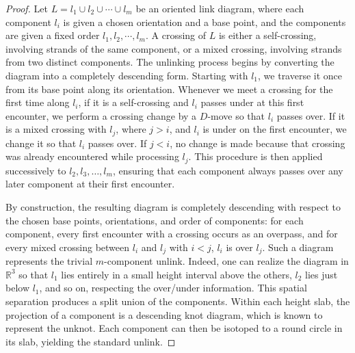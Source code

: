 \documentclass[10pt,a4paper]{amsart}
\begin{document}
\begin{proof}
Let $L = l_1 \cup l_2 \cup \cdots \cup l_m$ be an oriented link diagram, where each component $l_i$ is given a chosen orientation and a base point, and the components are given a fixed order $l_1, l_2, \cdots, l_m$. A crossing of $L$ is either a self-crossing, involving strands of the same component, or a mixed crossing, involving strands from two distinct components. The unlinking process begins by converting the diagram into a completely descending form. Starting with $l_1$, we traverse it once from its base point along its orientation. Whenever we meet a crossing for the first time along $l_i$, if it is a self-crossing and $l_i$ passes under at this first encounter, we perform a crossing change by a $D$-move so that $l_i$ passes over. If it is a mixed crossing with $l_j$, where $j>i$, and $l_i$ is under on the first encounter, we change it so that $l_i$ passes over. If $j<i$, no change is made because that crossing was already encountered while processing $l_j$. This procedure is then applied successively to $l_2, l_3, \dots, l_m$, ensuring that each component always passes over any later component at their first encounter.

By construction, the resulting diagram is completely descending with respect to the chosen base points, orientations, and order of components: for each component, every first encounter with a crossing occurs as an overpass, and for every mixed crossing between $l_i$ and $l_j$ with $i<j$, $l_i$ is over $l_j$. Such a diagram represents the trivial $m$-component unlink. Indeed, one can realize the diagram in $\mathbb{R}^3$ so that $l_1$ lies entirely in a small height interval above the others, $l_2$ lies just below $l_1$, and so on, respecting the over/under information. This spatial separation produces a split union of the components. Within each height slab, the projection of a component is a descending knot diagram, which is known to represent the unknot. Each component can then be isotoped to a round circle in its slab, yielding the standard unlink.
\end{proof} 
\end{document}
